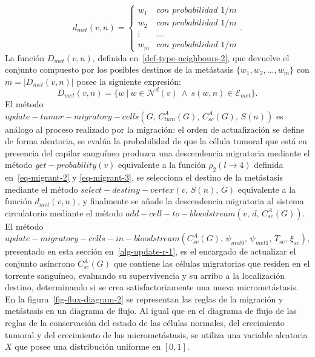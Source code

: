 \begin{equation*}
d_{met}(v,n) = \left\lbrace
	\begin{array}{ll}
		w_1 & \textit{con probabilidad } 1/m\\
		w_2 & \textit{con probabilidad } 1/m\\
		\vdots & \ldots\\
		w_m & \textit{con probabilidad } 1/m
	\end{array}
\right..
\end{equation*}
La funci\'on $D_{met}(v,n)$, definida en~\ref{def-type-neighbours-2}, que devuelve el conjunto compuesto por los posibles destinos de la met\'astasis $\lbrace w_1, w_2, \ldots, w_m \rbrace$ con $m = |D_{met}(v,n)|$ posee la siguiente expresi\'on:
\begin{equation*}
D_{met}(v,n) = \lbrace w~|~w \in \mathcal{N}^d(v)~\wedge~s(w,n) \in \mathcal{E}_{met} \rbrace.
\end{equation*}
El m\'etodo $update-tumor-migratory-cells(G,\,C_{tum}^A(G),\,C_{sc}^A(G),\,S(n))$ es an\'alogo al proceso realizado por la migraci\'on: el orden de actualizaci\'on se define de forma aleatoria, se eval\'ua la probabilidad de que la c\'elula tumoral que est\'a en presencia del capilar sangu\'ineo produzca una descendencia migratoria mediante el m\'etodo $get-probability(v)$ equivalente a la funci\'on $\rho_2(l \rightarrow 4)$ definida en~\ref{eq-migrant-2} y \ref{eq-migrant-3}, se selecciona el destino de la met\'astasis mediante el m\'etodo $select-destiny-vertex(v,\,S(n),\,G)$ equivalente a la funci\'on $d_{met}(v,n)$, y finalmente se a\~nade la descendencia migratoria al sistema circulatorio mediante el m\'etodo $add-cell-to-bloodstream(v,\,d,\,C_{sc}^A(G))$. El m\'etodo $update-migratory-cells-in-bloodstream(C_{sc}^A(G),\,\psi_{met0},\,\psi_{met1},\,T_{sc},\,\xi_{sc})$, presentado en esta secci\'on en~\ref{alg-update-r-1}, es el encargado de actualizar el conjunto as\'incrono $C_{sc}^A(G)$ que contiene las c\'elulas migratorias que residen en el torrente sangu\'ineo, evaluando su supervivencia y su arribo a la localizaci\'on destino, determinando si se crea satisfactoriamente una nueva micromet\'astasis. En la figura~\ref{fig-flux-diagram-2} se representan las reglas de la migraci\'on y met\'astasis en un diagrama de flujo. Al igual que en el diagrama de flujo de las reglas de la conservaci\'on del estado de las c\'elulas normales, del crecimiento tumoral y del crecimiento de las micromet\'astasis, se utiliza una variable aleatoria $X$ que posee una distribuci\'on uniforme en $[0,1]$. 